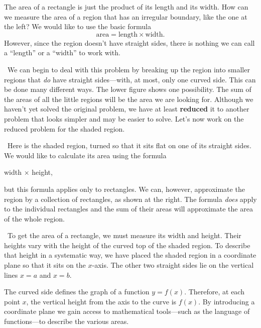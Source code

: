 
The area of a rectangle is just the product of its length and its width.  How can we measure the area of a region that has an irregular boundary, like the one at the left?  We would like to use the basic formula
	\[
\mbox{area} = \mbox{length} \times \mbox{width}.
\]
However, since the region doesn't have straight sides, there is nothing we can call a ``length'' or a ``width'' to work with.  

\quad \  We can begin to deal with this problem by breaking up the region into smaller regions that {\em do\/} have straight sides---with, at most, only one curved side.  This can be done many different ways.  The lower figure shows one possibility.  The sum of the areas of all the little regions will be the area we are looking for.  Although we haven't yet solved the original problem, we have at least {\bf reduced} it to another problem that looks simpler and may be easier to solve.  Let's now work on the reduced problem for the shaded region.





\quad \ Here is the shaded region, turned so that it sits flat on one
of its straight sides.  We would like to calculate its area using the
formula
\begin{center}
	width $\times$ height,
\end{center}
but this formula applies only to rectangles.  We can, however,
approximate the region by a collection of rectangles, as shown at the
right.  The formula {\em does\/} apply to the individual rectangles
and the sum of their areas will approximate the area of the whole
region.




\quad \ To get the area of a rectangle, we must measure its width and
height.  Their heights vary with the height of the curved top of the
shaded region.  To describe that height in a systematic way, we have
placed the shaded region in a coordinate plane so that it sits on the
$x$-axis.  The other two straight sides lie on the vertical lines $x =
a$ and $x = b$.  \linebreak




The curved side defines the graph of a function $y = f(x)$.
Therefore, at each point $x$, the vertical height from the axis to the
curve is $f(x)$.  By introducing a coordinate plane we gain access to
mathematical tools---such as the language of functions---to describe
the various areas.

